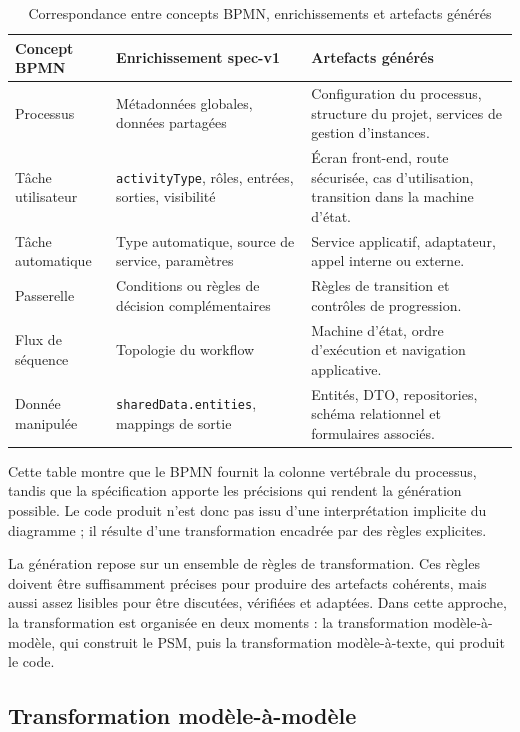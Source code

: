 \begin{table}[H]
\centering
\small
\caption{Correspondance entre concepts BPMN, enrichissements et artefacts générés}
\label{tab:chap3-correspondance}
\begin{tabular}{p{3.5cm}p{4.8cm}p{5.8cm}}
\hline
\textbf{Concept BPMN} & \textbf{Enrichissement spec-v1} & \textbf{Artefacts générés} \\
\hline
Processus & Métadonnées globales, données partagées & Configuration du processus, structure du projet, services de gestion d'instances. \\
Tâche utilisateur & \texttt{activityType}, rôles, entrées, sorties, visibilité & Écran front-end, route sécurisée, cas d'utilisation, transition dans la machine d'état. \\
Tâche automatique & Type automatique, source de service, paramètres & Service applicatif, adaptateur, appel interne ou externe. \\
Passerelle & Conditions ou règles de décision complémentaires & Règles de transition et contrôles de progression. \\
Flux de séquence & Topologie du workflow & Machine d'état, ordre d'exécution et navigation applicative. \\
Donnée manipulée & \texttt{sharedData.entities}, mappings de sortie & Entités, DTO, repositories, schéma relationnel et formulaires associés. \\
\hline
\end{tabular}
\end{table}

Cette table montre que le BPMN fournit la colonne vertébrale du processus, tandis que la spécification apporte les précisions qui rendent la génération possible. Le code produit n'est donc pas issu d'une interprétation implicite du diagramme ; il résulte d'une transformation encadrée par des règles explicites.


La génération repose sur un ensemble de règles de transformation. Ces règles doivent être suffisamment précises pour produire des artefacts cohérents, mais aussi assez lisibles pour être discutées, vérifiées et adaptées. Dans cette approche, la transformation est organisée en deux moments : la transformation modèle-à-modèle, qui construit le PSM, puis la transformation modèle-à-texte, qui produit le code.

\subsection{Transformation modèle-à-modèle}

